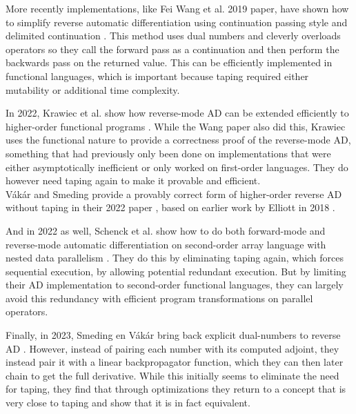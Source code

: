         More recently implementations, like Fei Wang et al. 2019 paper, have shown how to simplify reverse automatic differentiation using continuation passing style and delimited continuation \cite{wang2019demystifying}.
        This method uses dual numbers and cleverly overloads operators so they call the forward pass as a continuation and then perform the backwards pass on the returned value.
        This can be efficiently implemented in functional languages, which is important because taping required either mutability or additional time complexity.

        In 2022, Krawiec et al. show how reverse-mode AD can be extended efficiently to higher-order functional programs \cite{krawiec2022provably}.
        While the Wang paper also did this, Krawiec uses the functional nature to provide a correctness proof of the reverse-mode AD, something that had previously only been done on implementations that were either asymptotically inefficient or only worked on first-order languages.
        They do however need taping again to make it provable and efficient.\\
        Vákár and Smeding provide a provably correct form of higher-order reverse AD without taping in their 2022 paper \cite{vakar2022chad}, based on earlier work by Elliott in 2018 \cite{elliott2018simple}.

        And in 2022 as well, Schenck et al. show how to do both forward-mode and reverse-mode automatic differentiation on second-order array language with nested data parallelism \cite{schenck2022ad}.
        They do this by eliminating taping again, which forces sequential execution, by allowing potential redundant execution.
        But by limiting their AD implementation to second-order functional languages, they can largely avoid this redundancy with efficient program transformations on parallel operators.

        Finally, in 2023, Smeding en Vákár bring back explicit dual-numbers to reverse AD \cite{smeding2023efficient}.
        However, instead of pairing each number with its computed adjoint, they instead pair it with a linear backpropagator function, which they can then later chain to get the full derivative.
        While this initially seems to eliminate the need for taping, they find that through optimizations they return to a concept that is very close to taping and show that it is in fact equivalent.

